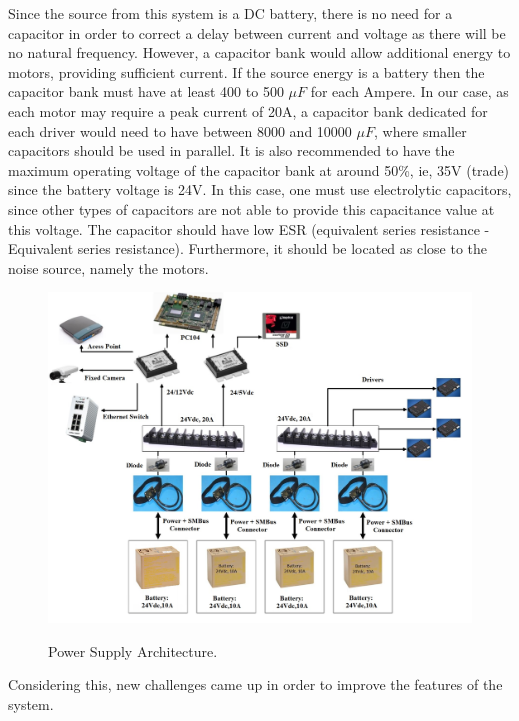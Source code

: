 \documentclass{ifacconf}
\begin{document}
Since the source from this system is a DC battery, there is no need for a
capacitor in order to correct a delay between current and voltage as there will
be no natural frequency. However, a capacitor bank would allow additional
energy to motors, providing sufficient current. If the source energy is a
battery then the capacitor bank must have at least 400 to 500 $\mu F$ for each
Ampere. In our case, as each motor may require a peak current of 20A, a
capacitor bank dedicated for each driver would need to have between 8000 and
10000 $\mu F$, where smaller capacitors should be used in parallel. It is also
recommended to have the maximum operating voltage of the capacitor bank at
around 50\%, ie, 35V (trade) since the battery voltage is 24V. In this case,
one must use electrolytic capacitors, since other types of capacitors are not
able to provide this capacitance value at this voltage.
The capacitor should have low ESR (equivalent series resistance - Equivalent
series resistance). Furthermore, it should be located as close to the noise
source, namely the motors.

\begin{figure}[ht]
\centering
    \includegraphics[angle=90,width=1\columnwidth]{figs/DiagramaSAM.jpg}  %
    \label{fig:DiagramaSAM}
\caption{Power Supply Architecture.}\vspace{-0.25cm}
\end{figure}

Considering this, new challenges came up in order to improve the features of
the system.
\end{document}
